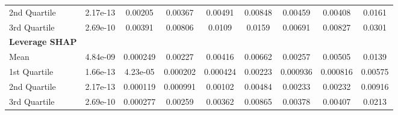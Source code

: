 {\begin{tabular} {lcccccccc}
\hspace{7pt}2nd Quartile & \cellcolor{silver!60}2.17e-13 & \cellcolor{silver!60}0.00205 & \cellcolor{silver!60}0.00367 & \cellcolor{silver!60}0.00491 & \cellcolor{silver!60}0.00848 & \cellcolor{silver!60}0.00459 & \cellcolor{silver!60}0.00408 & \cellcolor{silver!60}0.0161 \\ 
\hspace{7pt}3rd Quartile & \cellcolor{silver!60}2.69e-10 & \cellcolor{silver!60}0.00391 & \cellcolor{silver!60}0.00806 & \cellcolor{silver!60}0.0109 & \cellcolor{silver!60}0.0159 & \cellcolor{silver!60}0.00691 & \cellcolor{silver!60}0.00827 & \cellcolor{silver!60}0.0301 \\ 
\addlinespace[1ex] 
\textbf{Leverage SHAP} &  &  &  &  &  &  &  &  \\ 
\hspace{7pt}Mean & \cellcolor{gold!60}4.84e-09 & \cellcolor{gold!60}0.000249 & \cellcolor{gold!60}0.00227 & \cellcolor{gold!60}0.00416 & \cellcolor{gold!60}0.00662 & \cellcolor{gold!60}0.00257 & \cellcolor{gold!60}0.00505 & \cellcolor{gold!60}0.0139 \\ 
\hspace{7pt}1st Quartile & \cellcolor{silver!60}1.66e-13 & \cellcolor{gold!60}4.23e-05 & \cellcolor{gold!60}0.000202 & \cellcolor{gold!60}0.000424 & \cellcolor{gold!60}0.00223 & \cellcolor{gold!60}0.000936 & \cellcolor{gold!60}0.000816 & \cellcolor{gold!60}0.00575 \\ 
\hspace{7pt}2nd Quartile & \cellcolor{gold!60}2.17e-13 & \cellcolor{gold!60}0.000119 & \cellcolor{gold!60}0.000991 & \cellcolor{gold!60}0.00102 & \cellcolor{gold!60}0.00484 & \cellcolor{gold!60}0.00233 & \cellcolor{gold!60}0.00232 & \cellcolor{gold!60}0.00916 \\ 
\hspace{7pt}3rd Quartile & \cellcolor{gold!60}2.69e-10 & \cellcolor{gold!60}0.000277 & \cellcolor{gold!60}0.00259 & \cellcolor{gold!60}0.00362 & \cellcolor{gold!60}0.00865 & \cellcolor{gold!60}0.00378 & \cellcolor{gold!60}0.00407 & \cellcolor{gold!60}0.0213 \\ 
\bottomrule
\end{tabular}}